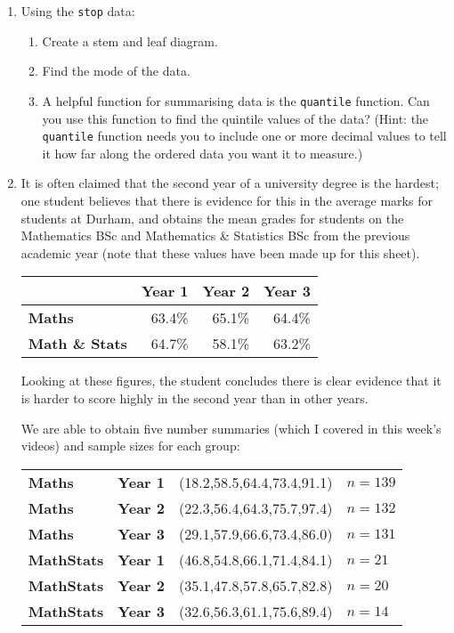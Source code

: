 \documentclass[11pt,a4paper]{article}
\begin{document}
\begin{enumerate}
\item Using the \texttt{stop} data:
\begin{enumerate}
\item Create a stem and leaf diagram.
\item Find the mode of the data. 
\item A helpful function for summarising data is the \texttt{quantile} function. Can you use this function to find the quintile values of the data? (Hint: the \texttt{quantile} function needs you to include one or more decimal values to tell it how far along the ordered data you want it to measure.)

\end{enumerate}

\item It is often claimed that the second year of a university degree is the
hardest; one student believes that there is evidence for this in the average
marks for students at Durham, and obtains the mean grades for  students on the Mathematics BSc and Mathematics \& Statistics BSc from the previous academic year (note that these values have been made up for this sheet).

\begin{table}
\begin{tabular}{l|rrr}
          & \bf Year 1 & \bf Year 2 & \bf Year 3\\
\hline
\bf Maths     & 63.4\% & 65.1\% & 64.4\% \\
\bf Math \& Stats & 64.7\% & 58.1\% & 63.2\%
\end{tabular}
\end{table}

Looking at these figures, the student concludes there is clear evidence that it is harder to score highly in the second year than in other years. 
  
We are able to obtain five number summaries (which I covered in this week's videos) and sample sizes for each group:

 
\begin{table}
\begin{tabular}{llll}
\bf Maths & \bf Year 1 & (18.2,58.5,64.4,73.4,91.1) & $n=139$\\
\bf Maths & \bf Year 2 & (22.3,56.4,64.3,75.7,97.4) & $n=132$\\
\bf Maths & \bf Year 3 & (29.1,57.9,66.6,73.4,86.0) & $n=131$\\
\hline
\bf MathStats & \bf Year 1 & (46.8,54.8,66.1,71.4,84.1) & $n=21$\\
\bf MathStats & \bf Year 2 & (35.1,47.8,57.8,65.7,82.8) & $n=20$\\
\bf MathStats & \bf Year 3 & (32.6,56.3,61.1,75.6,89.4) & $n=14$
\end{tabular}
\end{table}
 


\end{enumerate}
\end{document}
